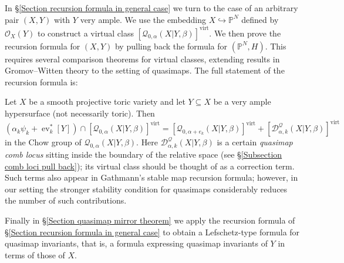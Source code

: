 \documentclass[11pt]{amsart}
\newcommand{\Q}[4]{\mathcal{Q}_{#1,#2}(#3,#4)}
\newcommand{\PP}{\mathbb P}
\newcommand{\OO}{\mathcal{O}}
\newcommand{\virt}[1]{[#1]^{\operatorname{virt}}}
\newcommand{\ev}{\operatorname{ev}}
\theoremstyle{definition}
\newenvironment{customthm}[1]
  {\renewcommand\theinnercustomthm{#1}\innercustomthm}
  {\endinnercustomthm}
\theoremstyle{definition}
\begin{document}
In \S \ref{Section recursion formula in general case} we turn to the case of an arbitrary pair $(X,Y)$ with $Y$ very ample. We use the embedding $X \hookrightarrow \PP^N$ defined by $\OO_X(Y)$ to construct a virtual class $\virt{\Q{0}{\alpha}{X|Y}{\beta}}$.
We then prove the recursion formula for $(X,Y)$ by pulling back the formula for $(\PP^N,H)$. This requires several comparison theorems for virtual classes, extending results in Gromov--Witten theory to the setting of quasimaps. The full statement of the recursion formula is:

\begin{customthm}{\ref{Theorem general recursion}} Let $X$ be a smooth projective toric variety and let $Y \subseteq X$ be a very ample hypersurface (not necessarily toric). Then
\begin{equation*} (\alpha_k \psi_k + \ev_k^* [Y]) \cap \virt{\Q{0}{\alpha}{X|Y}{\beta}} = \virt{\Q{0}{\alpha+e_k}{X|Y}{\beta}} + \virt{\mathcal D^\mathcal{Q}_{\alpha,k}(X|Y,\beta)} \end{equation*}
in the Chow group of $\Q{0}{\alpha}{X|Y}{\beta}$. 
\end{customthm}
\noindent Here $\mathcal D^\mathcal{Q}_{\alpha,k}(X|Y,\beta)$ is a certain \emph{quasimap comb locus} sitting inside the boundary of the relative space (see \S \ref{Subsection comb loci pull back}); its virtual class should be thought of as a correction term. Such terms also appear in Gathmann's stable map recursion formula; however, in our setting the stronger stability condition for quasimaps considerably reduces the number of such contributions.

Finally in \S \ref{Section quasimap mirror theorem} we apply the recursion formula of \S \ref{Section recursion formula in general case} to obtain a Lefschetz-type formula for quasimap invariants, that is, a formula expressing quasimap invariants of $Y$ in terms of those of $X$. 
\end{document}
